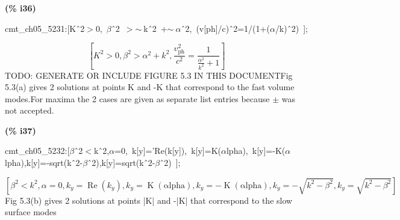 \documentclass[fleqn]{article}
\begin{document}
\noindent
\begin{minipage}[t]{4.000000em}\color{red}\bfseries
(\% i36)	
\end{minipage}
\begin{minipage}[t]{\textwidth}\color{blue}
cmt\_ch05\_5231:[K\^\ 2\ensuremath{>}0,\ \ensuremath{\beta}\^\ 2\ \ensuremath{>}\ensuremath{\sim\ }k\^\ 2\ +\ensuremath{\sim\ }\ensuremath{\alpha}\^\ 2,\ (v[ph]/c)\^\ 2=1/(1+(\ensuremath{\alpha}/k)\^\ 2)\ ];
\end{minipage}
\[\displaystyle \tag{\% o36} 
\left[ {{K}^{2}}\operatorname{>  }0\operatorname{,}{{\beta }^{2}}\operatorname{>  }{{\alpha }^{2}}+{{k}^{2}}\operatorname{,}\frac{{{v}_{\ensuremath{\mathrm{ph}}}^{2}}}{{{c}^{2}}}=\frac{1}{\frac{{{\alpha }^{2}}}{{{k}^{2}}}+1}\right] \mbox{}
\]
TODO: GENERATE OR INCLUDE FIGURE 5.3 IN THIS DOCUMENTFig 5.3(a) gives 2 solutions at points K and -K that correspond to the fast volume modes.For maxima the 2 cases are given as separate list entries because \ensuremath{\pm} was not accepted.


\noindent
\begin{minipage}[t]{4.000000em}\color{red}\bfseries
(\% i37)	
\end{minipage}
\begin{minipage}[t]{\textwidth}\color{blue}
cmt\_ch05\_5232:[\ensuremath{\beta}\^\ 2\ensuremath{<}k\^\ 2,\ensuremath{\alpha}=0,\ k[y]='Re(k[y]),\ k[y]=K(\ensuremath{\alpha}lpha),\ k[y]=-K(\ensuremath{\alpha}lpha),k[y]=-sqrt(k\^\ 2-\ensuremath{\beta}\^\ 2),k[y]=sqrt(k\^\ 2-\ensuremath{\beta}\^\ 2)\ ];
\end{minipage}
\[\displaystyle \tag{\% o37} 
\left[ {{\beta }^{2}}\operatorname{<  }{{k}^{2}}\operatorname{,}\alpha =0\operatorname{,}{k_y}=\operatorname{Re}\left( {k_y}\right) \operatorname{,}{k_y}=\operatorname{K}\left( \ensuremath{\mathrm{\alpha lpha}}\right) \operatorname{,}{k_y}=-\operatorname{K}\left( \ensuremath{\mathrm{\alpha lpha}}\right) \operatorname{,}{k_y}=-\sqrt{{{k}^{2}}-{{\beta }^{2}}}\operatorname{,}{k_y}=\sqrt{{{k}^{2}}-{{\beta }^{2}}}\right] \mbox{}
\]
Fig 5.3(b) gives 2 solutions at points |K| and -|K| that correspond to the slow surface modes
\end{document}
